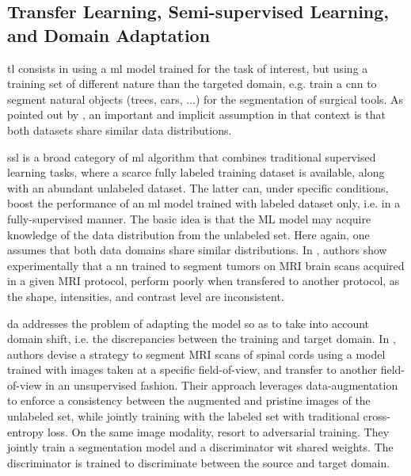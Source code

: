 \subsection{Transfer Learning, Semi-supervised Learning, and Domain Adaptation}
\gls{tl} consists in using a \gls{ml} model trained for the task of interest, but using a training set of different nature than the targeted domain, e.g. train a \gls{cnn} to segment natural objects (trees, cars, ...) for the segmentation of surgical tools.
As pointed out by \cite{oliver18}, an important and implicit assumption in that context is that both datasets share similar data distributions.

\gls{ssl} is a broad category of \gls{ml} algorithm that combines traditional supervised learning tasks, where a scarce fully labeled training dataset is available, along with an abundant unlabeled dataset.
The latter can, under specific conditions, boost the performance of an \gls{ml} model trained with labeled dataset only, i.e. in a fully-supervised manner.
The basic idea is that the ML model may acquire knowledge of the data distribution from the unlabeled set.
Here again, one assumes that both data domains share similar distributions.
In \cite{ghafoorian17}, authors show experimentally that a \gls{nn} trained to segment tumors on MRI brain scans acquired in a given MRI protocol, perform poorly when transfered to another protocol, as the shape, intensities, and contrast level are inconsistent.

\gls{da} addresses the problem of adapting the model so as to take into account domain shift, i.e. the discrepancies between the training and target domain.
In \cite{perone19}, authors devise a strategy to segment MRI scans of spinal cords using a model trained with images taken at a specific field-of-view, and transfer to another field-of-view in an unsupervised fashion.
Their approach leverages data-augmentation to enforce a consistency between the augmented and pristine images of the unlabeled set, while jointly training with the labeled set with traditional cross-entropy loss.
On the same image modality, \cite{li20} resort to adversarial training. They jointly train a segmentation model and a discriminator wit shared weights. The discriminator is trained to discriminate between the source and target domain.

